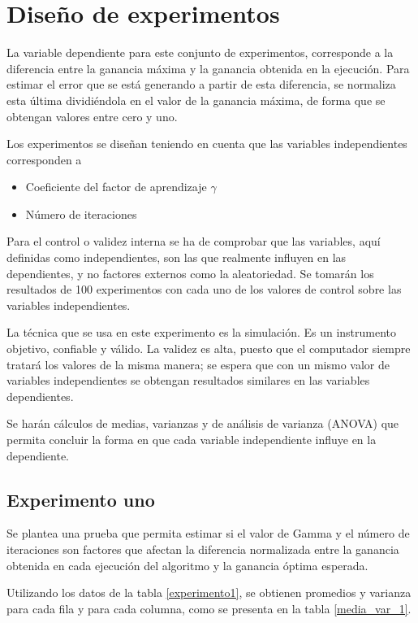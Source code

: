 \section{Diseño de experimentos}

La variable dependiente para este conjunto de experimentos, corresponde a la diferencia entre la ganancia máxima y la ganancia obtenida en la ejecución. Para estimar el error que se está generando a partir de esta diferencia, se normaliza esta última dividiéndola en el valor de la ganancia máxima, de forma que se obtengan valores entre cero y uno.

Los experimentos se diseñan teniendo en cuenta que las variables independientes corresponden a 
\begin{itemize}
    \item Coeficiente del factor de aprendizaje $\gamma$
    \item Número de iteraciones
\end{itemize}

Para el control o validez interna se ha de comprobar que las variables, aquí definidas como independientes, son las que realmente influyen en las dependientes, y no factores externos como la aleatoriedad. Se tomarán los resultados de 100 experimentos con cada uno de los valores de control sobre las variables independientes.

La técnica que se usa en este experimento es la simulación. Es un instrumento objetivo, confiable y válido. La validez es alta, puesto que el computador siempre tratará los valores de la misma manera; se espera que con un mismo valor de variables independientes se obtengan resultados similares en las variables dependientes.

Se harán cálculos de medias, varianzas y de análisis de varianza (ANOVA) que permita concluir la forma en que cada variable independiente influye en la dependiente.

\subsection{Experimento uno}
Se plantea una prueba que permita estimar si el valor de Gamma y el número de iteraciones son factores que afectan la diferencia normalizada entre la ganancia obtenida en cada ejecución del algoritmo y la ganancia óptima esperada.

Utilizando los datos de la tabla \ref{experimento1}, se obtienen promedios y varianza para cada fila y para cada columna, como se presenta en la tabla \ref{media_var_1}.

